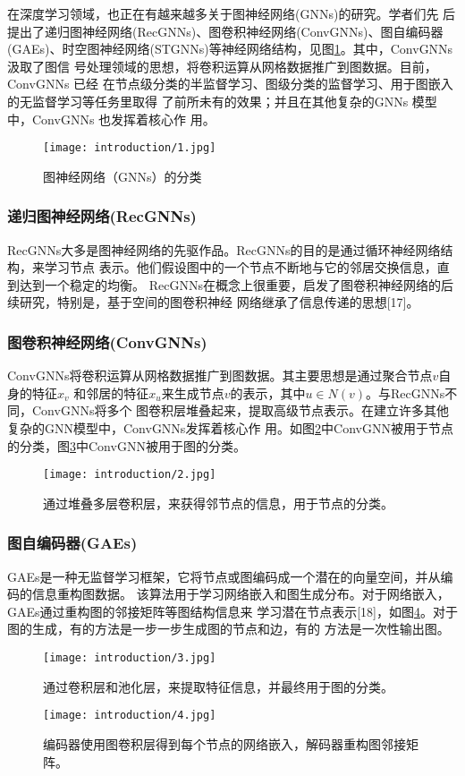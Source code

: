 在深度学习领域，也正在有越来越多关于图神经网络(GNNs)的研究。学者们先
后提出了递归图神经网络(RecGNNs)、图卷积神经网络(ConvGNNs)、图自编码器
(GAEs)、时空图神经网络(STGNNs)等神经网络结构，见图\ref{1-1}。其中，ConvGNNs 汲取了图信
号处理领域的思想，将卷积运算从网格数据推广到图数据。目前，ConvGNNs 已经
在节点级分类的半监督学习、图级分类的监督学习、用于图嵌入的无监督学习等任务里取得
了前所未有的效果；并且在其他复杂的GNNs 模型中，ConvGNNs 也发挥着核心作
用。

\begin{figure}[htbp]
    \centering
    \texttt{[image: introduction/1.jpg]}
    \caption{\label{1-1}图神经网络（GNNs）的分类}
\end{figure}

\subsubsection{递归图神经网络(RecGNNs)}
RecGNNs大多是图神经网络的先驱作品。RecGNNs的目的是通过循环神经网络结构，来学习节点
表示。他们假设图中的一个节点不断地与它的邻居交换信息，直到达到一个稳定的均衡。
RecGNNs在概念上很重要，启发了图卷积神经网络的后续研究，特别是，基于空间的图卷积神经
网络继承了信息传递的思想[17]。

\subsubsection{图卷积神经网络(ConvGNNs)}
ConvGNNs将卷积运算从网格数据推广到图数据。其主要思想是通过聚合节点$v$自身的特征$x_{v}$
和邻居的特征$x_{u}$来生成节点$v$的表示，其中$u\in N(v)$。与RecGNNs不同，ConvGNNs将多个
图卷积层堆叠起来，提取高级节点表示。在建立许多其他复杂的GNN模型中，ConvGNNs发挥着核心作
用。如图\ref{1-2}中ConvGNN被用于节点的分类，图\ref{1-3}中ConvGNN被用于图的分类。
\begin{figure}[htbp]
    \centering
    \captionsetup{width=10cm}
    \texttt{[image: introduction/2.jpg]}
    \caption{\label{1-2}通过堆叠多层卷积层，来获得邻节点的信息，用于节点的分类。}
\end{figure}

\subsubsection{图自编码器(GAEs)}
GAEs是一种无监督学习框架，它将节点或图编码成一个潜在的向量空间，并从编码的信息重构图数据。
该算法用于学习网络嵌入和图生成分布。对于网络嵌入，GAEs通过重构图的邻接矩阵等图结构信息来
学习潜在节点表示[18]，如图\ref{1-4}。对于图的生成，有的方法是一步一步生成图的节点和边，有的
方法是一次性输出图。
\begin{figure}[htbp]
    \centering
    \captionsetup{width=10cm}
    \texttt{[image: introduction/3.jpg]}
    \caption{\label{1-3}通过卷积层和池化层，来提取特征信息，并最终用于图的分类。}
\end{figure}
\begin{figure}[htbp]
    \centering
    \captionsetup{width=10cm}
    \texttt{[image: introduction/4.jpg]}
    \caption{\label{1-4}编码器使用图卷积层得到每个节点的网络嵌入，解码器重构图邻接矩阵。}
\end{figure}

